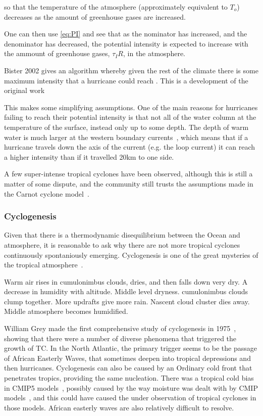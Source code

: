 so that the temperature of the atmosphere (approximately equivalent to $T_{o}$)
decreases as the amount of greenhouse gases are increased.


One can then use \ref{eq:PI} and see that as the nominator has increased, and the
denominator has decreased, the potential intensity is expected to increase with the
ammount of greenhouse gases, $\tau_IR$, in the atmosphere.


Bister 2002 gives an algorithm whereby given the rest of the climate
there is some maximum intensity that a hurricane could reach  \cite{bister2002low}.
This is a development of the original work~\cite{bister1996development,bister1998dissipative, bister2002low}

This makes some simplifying assumptions. One of the main reasons for
hurricanes failing to reach their potential intensity is that not all of the
water column at the temperature
of the surface, instead only up to some depth. The depth of warm water
is much larger at the western boundary currents~\cite{hogg1995western}, which means that if a hurricane
travels down the axis of the current (e.g. the loop current)
it can reach a higher intensity than
if it travelled 20km to one side.


A few super-intense tropical cyclones have been observed, although this is still a
matter of some dispute, and the community still trusts the assumptions made in the
Carnot cyclone model~\cite{camargo2019tropical}.




\subsubsection{Cyclogenesis}


Given that there is a thermodynamic disequilibrium between the Ocean and
atmosphere, it is reasonable to ask why there are not more tropical cyclones
continuously spontaniously emerging. Cyclogenesis is one of the
 great mysteries of the tropical atmosphere~\cite{emanuel2005divine}.

Warm air rises in cumulonimbus clouds,
 dries, and then falls down very dry.
A decrease in humidity with altitude.
 Middle level dryness.
cumulonimbus clouds clump together.
 More updrafts give more rain.
Nascent cloud cluster dies away.
Middle atmosphere becomes humidified.

William Grey made the first comprehensive study of cyclogenesis in 1975~\cite{gray1975tropical},
showing that there were a number of diverse phenomena that triggered the growth of TC.
In the North Atlantic, the primary trigger seems to be the passage of African Easterly Waves,
that sometimes deepen into tropical depressions and then hurricanes. Cyclogenesis can also be caused by an Ordinary cold front that penetrates tropics,
providing the same nucleation. There was a tropical cold bias in CMIP5 models~\cite{camargo2013global},
possibly caused by the way moisture was dealt with by CMIP models~\cite{seager2019strengthening},
and this could have caused the under observation of tropical cyclones in those models.
African easterly waves are also relatively difficult to resolve.



